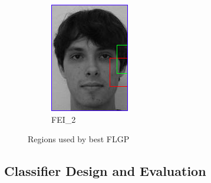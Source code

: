 \documentclass{article}
\begin{document}
\begin{figure}[h!]
\begin{subfigure}{0.49\linewidth}
		\includegraphics[width=\linewidth]{flgp_selection_f2.jpg}
		\caption{FEI\_2}
	\end{subfigure}
	\caption{Regions used by best FLGP}
\end{figure}
\subsection*{Classifier Design and Evaluation}
\end{document}
